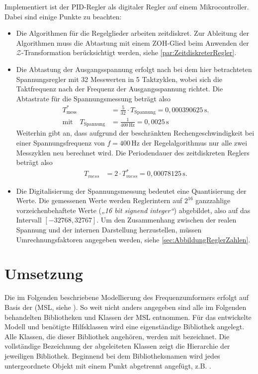 Implementiert ist der PID-Regler als digitaler Regler auf einem Mikrocontroller. Dabei sind einige Punkte zu beachten:
\begin{itemize}
    \item {Die Algorithmen für die Regelglieder arbeiten zeitdiskret. Zur Ableitung der Algorithmen muss die Abtastung mit einem ZOH-Glied beim Anwenden der $\mathcal{Z}$-Transformation berücksichtigt werden, siehe \cref{par:ZeitdiskreterRegler}.}
    \item {Die Abtastung der Ausgangsspannung erfolgt nach \cite{pillerpowerssystemsDigitalerSpannungsreglerSoftwaredokumentation1997} bei dem hier betrachteten Spannungsregler mit 32 Messwerten in 5 Taktzyklen, wobei sich die Taktfrequenz nach der Frequenz der Ausgangsspannung richtet. Die Abtastrate für die Spannungsmessung beträgt also
    \begin{align}
        T_{\mathrm{mess}}^*&= \frac{5}{32}\cdot T_{\mathrm{Spannung}} = 0,000390625\,\mathrm s. \\
        \text{mit} \quad
        T_{\mathrm{Spannung}}&= \frac{1}{400\,\mathrm{Hz}}=0,0025\,\mathrm s
    \end{align}
    Weiterhin gibt \cite{pillerpowerssystemsDigitalerSpannungsreglerSoftwaredokumentation1997} an, dass aufgrund der beschränkten Rechengeschwindigkeit bei einer Spannungsfrequenz von \(f=400\,\mathrm{Hz}\) der Regelalgorithmus nur alle zwei Messzyklen neu berechnet wird. Die Periodendauer des zeitdiskreten Reglers beträgt also
    \begin{align}
        T_{mess}&=2\cdot T_{mess}^*= 0,00078125\,\mathrm s.
    \end{align} }
    \item {Die Digitalisierung der Spannungsmessung bedeutet eine Quantisierung der Werte. Die gemessenen Werte werden Reglerintern auf \(2^{16}\) ganzzahlige vorzeichenbehaftete Werte (\emph{„16 bit signend integer“}) abgebildet, also auf das Intervall \([-32768,32767]\). Um den Zusammenhang zwischen der realen Spannung und der internen Darstellung herzustellen, müssen Umrechnungsfaktoren angegeben werden, siehe \cref{sec:AbbildungReglerZahlen}.}
\end{itemize}


\section{Umsetzung}\label{sec:umsetzung}

Die im Folgenden beschriebene Modellierung des Frequenzumformers erfolgt auf Basis der  (MSL, siehe \cite[]{modelicaassociationModelicaStandardLibrary2020}). So weit nicht anders angegeben sind alle im Folgenden behandelten Bibliotheken und Klassen der MSL entnommen. Für das entwickelte Modell und benötigte Hilfsklassen wird eine eigenständige Bibliothek  angelegt. Alle Klassen, die dieser Bibliothek angehören, werden mit  bezeichnet. Die vollständige Bezeichnung der abgeleiteten Klassen zeigt die Hierarchie der jeweiligen Bibliothek. Beginnend bei dem Bibliotheksnamen wird jedes untergeordnete Objekt mit einem Punkt abgetrennt angefügt, z.B. .

